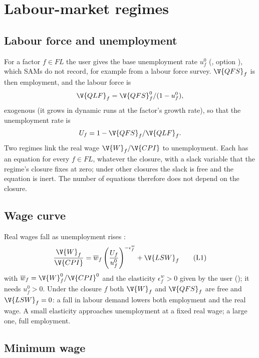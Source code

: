 \chapter{Labour-market regimes}\label{chap:labour}

\section{Labour force and unemployment}\label{sec:labourforce}

For a factor $f \in FL$ the user gives the base unemployment rate $u^0_f$
(, option ), which SAMs do not
record, for example from a labour force survey. $\V{QFS}_f$ is then
employment, and the labour force is
\begin{equation*}
\V{QLF}_f = \V{QFS}^0_f / (1 - u^0_f),
\end{equation*}
exogenous (it grows in dynamic runs at the factor's growth rate), so that the
unemployment rate is
\begin{equation*}
U_f = 1 - \V{QFS}_f / \V{QLF}_f .
\end{equation*}
Two regimes link the real wage $\V{W}_f / \V{CPI}$ to unemployment. Each has
an equation for every $f \in FL$, whatever the closure, with a slack variable
that the regime's closure fixes at zero; under other closures the slack is free
and the equation is inert. The number of equations therefore does not depend
on the closure.

\section{Wage curve}\label{sec:wagecurve}

Real wages fall as unemployment rises \citep{blanchflower1994}:
\begin{equation}
\frac{\V{W}_f}{\V{CPI}} = \overline{w}_f \left(\frac{U_f}{u^0_f}\right)^{-\epsilon^w_f} + \V{LSW}_f
\tag{L1}\label{eq:L1}
\end{equation}
with $\overline{w}_f = \V{W}^0_f / \V{CPI}^0$ and the elasticity
$\epsilon^w_f > 0$ given by the user (); it needs
$u^0_f > 0$. Under the closure $f$ both
$\V{W}_f$ and $\V{QFS}_f$ are free and $\V{LSW}_f = 0$: a fall in labour demand
lowers both employment and the real wage. A small elasticity approaches
unemployment at a fixed real wage; a large one, full employment.

\section{Minimum wage}\label{sec:minwage}

